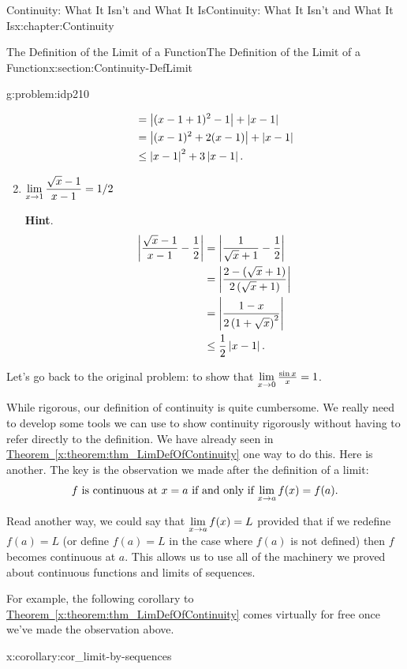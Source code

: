 \begin{chapterptx}{Continuity: What It Isn't and What It Is}{}{Continuity: What It Isn't and What It Is}{}{}{x:chapter:Continuity}
\begin{sectionptx}{The Definition of the Limit of a Function}{}{The Definition of the Limit of a Function}{}{}{x:section:Continuity-DefLimit}
\begin{problem}{}{g:problem:idp210}
\begin{enumerate}[font=\bfseries,label=(\alph*),ref=\alph*]
\begin{align*}
					& =\left|(x-1+1)^2-1\right|+\left|x-1\right|\\
					& =\left|(x-1)^2+2(x-1)\right|+\left|x-1\right|\\
					& \leq\left|x-1\right|^2 + 3\left|x-1\right|\text{.}
				\end{align*}
				\item{}\({\displaystyle\lim_{x\rightarrow 1}\frac{\sqrt{x}-1}{x-1}}=1/2\)%
				\par\smallskip%
				\noindent\textbf{\blocktitlefont Hint}.\hypertarget{g:hint:idp212}{}\quad{}%
				\begin{align*}
					\left|\frac{\sqrt{x}-1}{x-1}-\frac12\right|& = \left|\frac{1}{\sqrt{x}+1}-\frac12\right|\\
					& =\left|\frac{2-\left(\sqrt{x}+1\right)}{2\left(\sqrt{x}+1\right)}\right|\\
					& =\left|\frac{1-x}{2\left(1+\sqrt{x}\right)^2}\right|\\
					& \leq\frac12\left|x-1\right|.{}
				\end{align*}
			\end{enumerate}
		\end{problem}
		Let's go back to the original problem: to show that \({\displaystyle\lim_{x\rightarrow 0}\textstyle\frac{\sin x}{x}}=1\).%
		\par
		While rigorous, our definition of continuity is quite cumbersome. We really need to develop some tools we can use to show continuity rigorously without having to refer directly to the definition. We have already seen in \hyperref[x:theorem:thm_LimDefOfContinuity]{Theorem~{\xreffont\ref{x:theorem:thm_LimDefOfContinuity}}} one way to do this. Here is another. The key is the observation we made after the definition of a limit:%
		\begin{equation*}
			f \text{ is continuous at } x=a \text{ if and only if } {\displaystyle\lim_{x\rightarrow a}f(x)}=f(a)\text{.}
		\end{equation*}
		\par
		Read another way, we could say that \({\displaystyle\lim_{x\rightarrow a}f(x)}=L\) provided that if we redefine \(f(a)=L\) (or define \(f(a)=L\) in the case where \(f(a)\) is not defined) then \(f\) becomes continuous at \(a\). This allows us to use all of the machinery we proved about continuous functions and limits of sequences.%
		\par
		For example, the following corollary to \hyperref[x:theorem:thm_LimDefOfContinuity]{Theorem~{\xreffont\ref{x:theorem:thm_LimDefOfContinuity}}} comes virtually for free once we've made the observation above.%
		\begin{corollary}{}{}{x:corollary:cor_limit-by-sequences}%

\end{corollary}
\end{sectionptx}
\end{chapterptx}
